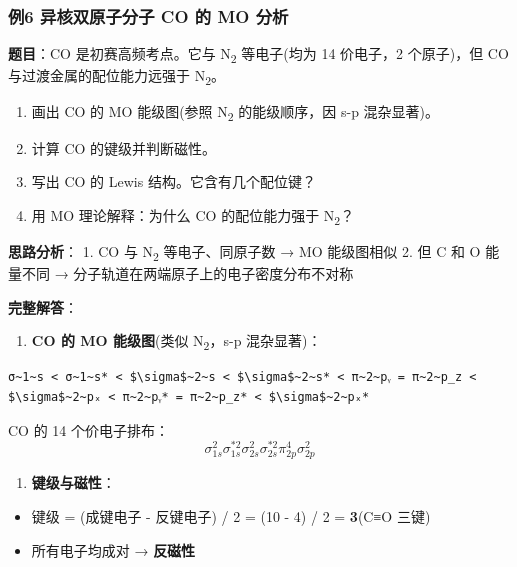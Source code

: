 \subsubsection{例6 异核双原子分子 CO 的 MO 分析}\label{ux4f8b6-ux5f02ux6838ux53ccux539fux5b50ux5206ux5b50-co-ux7684-mo-ux5206ux6790}

\textbf{题目}：CO 是初赛高频考点。它与 N\textsubscript{2} 等电子(均为 14 价电子，2 个原子)，但 CO 与过渡金属的配位能力远强于 N\textsubscript{2}。

\begin{enumerate}
\def\labelenumi{(\arabic{enumi})}
\tightlist
\item
  画出 CO 的 MO 能级图(参照 N\textsubscript{2} 的能级顺序，因 s-p 混杂显著)。
\item
  计算 CO 的键级并判断磁性。
\item
  写出 CO 的 Lewis 结构。它含有几个配位键？
\item
  用 MO 理论解释：为什么 CO 的配位能力强于 N\textsubscript{2}？
\end{enumerate}

\textbf{思路分析}：
1. CO 与 N\textsubscript{2} 等电子、同原子数 → MO 能级图相似
2. 但 C 和 O 能量不同 → 分子轨道在两端原子上的电子密度分布不对称

\textbf{完整解答}：

\begin{enumerate}
\def\labelenumi{(\arabic{enumi})}
\tightlist
\item
  \textbf{CO 的 MO 能级图}(类似 N\textsubscript{2}，s-p 混杂显著)：
\end{enumerate}

\begin{verbatim}
σ~1~s < σ~1~s* < $\sigma$~2~s < $\sigma$~2~s* < π~2~pᵧ = π~2~p_z < $\sigma$~2~pₓ < π~2~pᵧ* = π~2~p_z* < $\sigma$~2~pₓ*
\end{verbatim}

CO 的 14 个价电子排布：
\[
\sigma_{1s}^2 \sigma_{1s}^{*2} \sigma_{2s}^2 \sigma_{2s}^{*2} \pi_{2p}^4 \sigma_{2p}^2
\]

\begin{enumerate}
\def\labelenumi{(\arabic{enumi})}
\setcounter{enumi}{1}
\tightlist
\item
  \textbf{键级与磁性}：
\end{enumerate}

\begin{itemize}
\tightlist
\item
  键级 = (成键电子 - 反键电子) / 2 = (10 - 4) / 2 = \textbf{3}(C≡O 三键)
\item
  所有电子均成对 → \textbf{反磁性}
\end{itemize}

